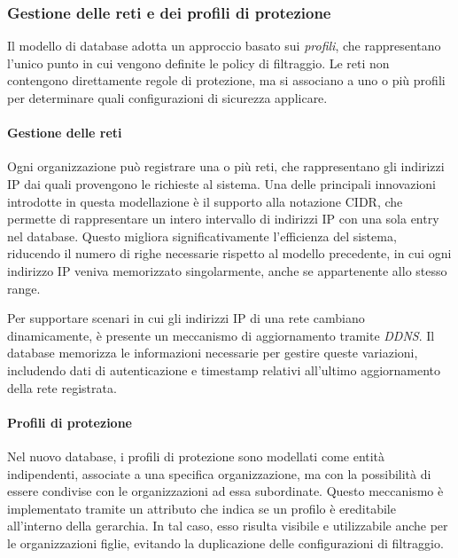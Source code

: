 \subsubsection{Gestione delle reti e dei profili di protezione}
Il modello di database adotta un approccio basato sui \emph{profili}, che rappresentano l’unico punto in cui vengono definite le policy di filtraggio. Le reti non contengono direttamente regole di protezione, ma si associano a uno o più profili per determinare quali configurazioni di sicurezza applicare.

\paragraph{Gestione delle reti}
Ogni organizzazione può registrare una o più reti, che rappresentano gli indirizzi IP dai quali provengono le richieste al sistema. Una delle principali innovazioni introdotte in questa modellazione è il supporto alla notazione CIDR, che permette di rappresentare un intero intervallo di indirizzi IP con una sola entry nel database. Questo migliora significativamente l’efficienza del sistema, riducendo il numero di righe necessarie rispetto al modello precedente, in cui ogni indirizzo IP veniva memorizzato singolarmente, anche se appartenente allo stesso range.

Per supportare scenari in cui gli indirizzi IP di una rete cambiano dinamicamente, è presente un meccanismo di aggiornamento tramite \emph{DDNS}. Il database memorizza le informazioni necessarie per gestire queste variazioni, includendo dati di autenticazione e timestamp relativi all’ultimo aggiornamento della rete registrata.

\paragraph{Profili di protezione}
Nel nuovo database, i profili di protezione sono modellati come entità indipendenti, associate a una specifica organizzazione, ma con la possibilità di essere condivise con le organizzazioni ad essa subordinate. Questo meccanismo è implementato tramite un attributo che indica se un profilo è ereditabile all'interno della gerarchia. In tal caso, esso risulta visibile e utilizzabile anche per le organizzazioni figlie, evitando la duplicazione delle configurazioni di filtraggio.

